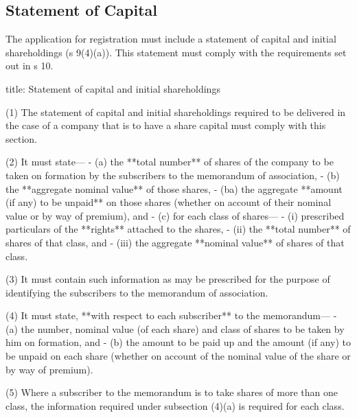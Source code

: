 \documentclass[
]{article}
\newenvironment{Shaded}{}{}
\newcommand{\NormalTok}[1]{#1}
\begin{document}
\hypertarget{statement-of-capital}{%
\subsection{Statement of Capital}\label{statement-of-capital}}

The application for registration must include a statement of capital and
initial shareholdings (s 9(4)(a)). This statement must comply with the
requirements set out in s 10.

\begin{Shaded}
\begin{Highlighting}[]
\NormalTok{title: Statement of capital and initial shareholdings}

\NormalTok{(1) The statement of capital and initial shareholdings required to be delivered in the case of a company that is to have a share capital must comply with this section.}

\NormalTok{(2) It must state—}
\NormalTok{{-} (a) the **total number** of shares of the company to be taken on formation by the subscribers to the memorandum of association,}
\NormalTok{{-} (b) the **aggregate nominal value** of those shares,}
\NormalTok{{-} (ba) the aggregate **amount (if any) to be unpaid** on those shares (whether on account of their nominal value or by way of premium), and}
\NormalTok{{-} (c) for each class of shares—}
\NormalTok{    {-} (i) prescribed particulars of the **rights** attached to the shares,}
\NormalTok{    {-} (ii) the **total number** of shares of that class, and}
\NormalTok{    {-} (iii) the aggregate **nominal value** of shares of that class.}

\NormalTok{(3) It must contain such information as may be prescribed for the purpose of identifying the subscribers to the memorandum of association.}

\NormalTok{(4) It must state, **with respect to each subscriber** to the memorandum—}
\NormalTok{{-} (a) the number, nominal value (of each share) and class of shares to be taken by him on formation, and}
\NormalTok{{-} (b) the amount to be paid up and the amount (if any) to be unpaid on each share (whether on account of the nominal value of the share or by way of premium).}

\NormalTok{(5) Where a subscriber to the memorandum is to take shares of more than one class, the information required under subsection (4)(a) is required for each class.}
\end{Highlighting}
\end{Shaded}
\end{document}
